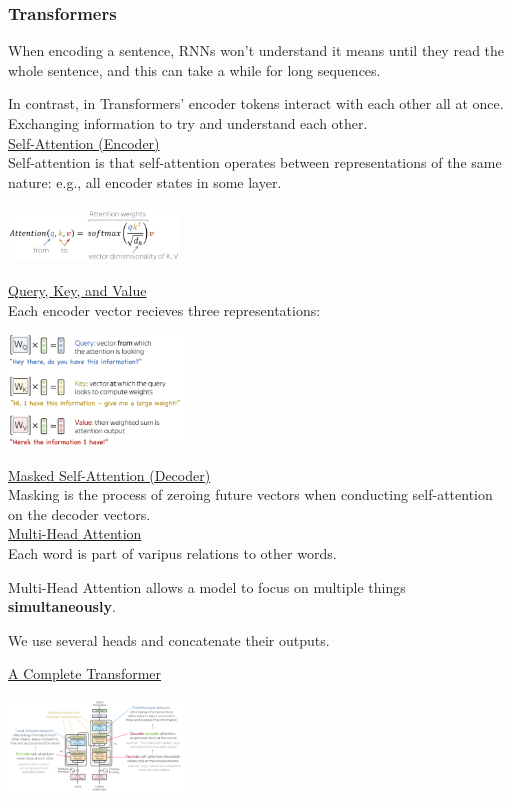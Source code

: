 \documentclass[8pt]{extarticle} %
\begin{document}
\begin{multicols*}{3}
\subsubsection*{Transformers}
When encoding a sentence, RNNs won't understand it means until they read the whole sentence, and this can take a while for long sequences. 

In contrast, in Transformers' encoder tokens interact with each other all at once. Exchanging information to try and understand each other. \\

\underline{Self-Attention (Encoder)}\\
Self-attention is that self-attention operates between representations of the same nature: e.g., all encoder states in some layer.
\begin{center}
    \includegraphics[width=0.35\textwidth]{media/attention-eq.png}
\end{center}

\underline{Query, Key, and Value}\\
Each encoder vector recieves three representations:
\begin{center}
    \includegraphics[width=0.35\textwidth]{media/key-query-value.png}
\end{center}

\underline{Masked Self-Attention (Decoder)}\\
Masking is the process of zeroing future vectors when conducting self-attention on the decoder vectors.\\

\underline{Multi-Head Attention}\\
Each word is part of varipus relations to other words.

Multi-Head Attention allows a model to focus on multiple things \textbf{simultaneously}. 

We use several heads and concatenate their outputs.

\underline{A Complete Transformer}
\begin{center}
    \includegraphics[width=0.35\textwidth]{media/transformer.png}
\end{center}


\end{multicols*}
\end{document}

